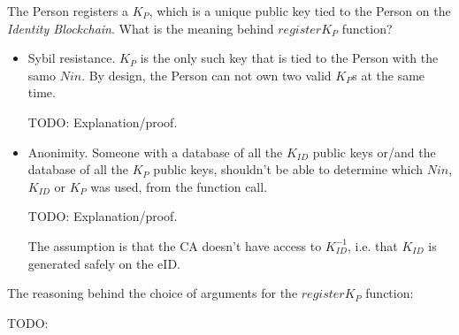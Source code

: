 \documentclass{article}
\newcommand{\khk}{K_{P}}
\newcommand{\kid}{K_{ID}}
\newcommand{\pbc}{\textit{Identity Blockchain}}
\begin{document}
\begin{enumerate}
  The Person registers a $\khk$, which is a unique public key tied to the Person on the \pbc{}.
  What is the meaning behind $register\khk$ function?
  \begin{itemize}
    \item Sybil resistance. $\khk$ is the only such key that is tied to the Person with the samo $Nin$.
      By design, the Person can not own two valid $\khk$s at the same time.

      TODO: Explanation/proof.
    \item Anonimity. Someone with a database of all the $\kid$ public keys or/and the database of all the $\khk$ public keys, shouldn't be able to determine which $Nin$, $\kid$ or $\khk$ was used, from the function call.

    TODO: Explanation/proof.

    The assumption is that the CA doesn't have access to $\kid^{-1}$, i.e. that $\kid$ is generated safely on the eID.
  \end{itemize}
  The reasoning behind the choice of arguments for the $register\khk$ function:

  TODO: 
\end{enumerate}

\newpage
\end{document}
